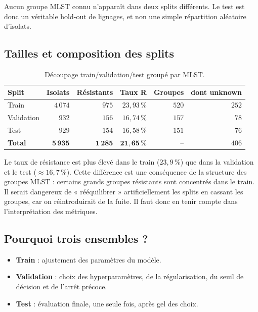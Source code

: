 \documentclass[11pt,a4paper]{article}
\begin{document}
\begin{keybox}
Aucun groupe MLST connu n'apparaît dans deux splits différents. Le test est donc un véritable hold-out de lignages, et non une simple répartition aléatoire d'isolats.
\end{keybox}

\subsection{Tailles et composition des splits}

\begin{table}[H]
\centering
\caption{Découpage train/validation/test groupé par MLST.}
\label{tab:splits}
\begin{tabular}{lrrrrr}
\toprule
\textbf{Split} & \textbf{Isolats} & \textbf{Résistants} & \textbf{Taux R} & \textbf{Groupes} & \textbf{dont unknown} \\
\midrule
Train & $4\,074$ & $975$ & $23{,}93\,\%$ & $520$ & $252$ \\
Validation & $932$ & $156$ & $16{,}74\,\%$ & $157$ & $78$ \\
Test & $929$ & $154$ & $16{,}58\,\%$ & $151$ & $76$ \\
\midrule
\textbf{Total} & $\mathbf{5\,935}$ & $\mathbf{1\,285}$ & $\mathbf{21{,}65\,\%}$ & -- & $406$ \\
\bottomrule
\end{tabular}
\end{table}

Le taux de résistance est plus élevé dans le train ($23{,}9\,\%$) que dans la validation et le test ($\approx 16{,}7\,\%$). Cette différence est une conséquence de la structure des groupes MLST : certains grands groupes résistants sont concentrés dans le train. Il serait dangereux de « rééquilibrer » artificiellement les splits en cassant les groupes, car on réintroduirait de la fuite. Il faut donc en tenir compte dans l'interprétation des métriques.

\subsection{Pourquoi trois ensembles ?}

\begin{itemize}[leftmargin=1.2em]
    \item \textbf{Train} : ajustement des paramètres du modèle.
    \item \textbf{Validation} : choix des hyperparamètres, de la régularisation, du seuil de décision et de l'arrêt précoce.
    \item \textbf{Test} : évaluation finale, une seule fois, après gel des choix.
\end{itemize}
\end{document}
